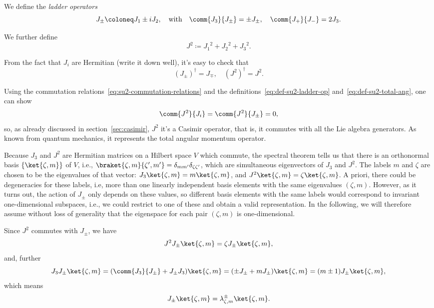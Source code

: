 We define the \emph{ladder operators}
\begin{equation}\label{eq:def-su2-ladder-op}
    J_\pm \coloneq J_1 \pm i J_2, \quad \textup{with} \quad \comm{J_3}{J_\pm} = \pm J_\pm, \quad \comm{J_+}{J_-} = 2 J_3 .
\end{equation}

We further define
\begin{equation}\label{eq:def-su2-total-ang}
    J^2 \coloneq {J_1}^2 + {J_2}^2 + {J_3}^2.
\end{equation}

From the fact that $J_i$ are Hermitian (write it down well), it's easy to check that
\begin{equation}
    (J_\pm)^\dagger = J_\mp, \quad (J^2)^\dagger = J^2 .
\end{equation}

Using the commutation relations~\eqref{eq:su2-commutation-relations} and the definitions~\eqref{eq:def-su2-ladder-op} and~\eqref{eq:def-su2-total-ang}, one can show
\begin{equation}
    \comm{J^2}{J_i} = \comm{J^2}{J_\pm} = 0,
\end{equation}
so, as already discussed in section~\eqref{sec:casimir}, $J^2$ it's a Casimir operator, that is, it commutes with all the Lie algebra generators. As known from quantum mechanics, it represents the total angular momentum operator.

Because $J_3$ and $J^2$ are Hermitian matrices on a Hilbert space $V$ which commute, the spectral theorem tells us that there is an orthonormal basis $\{ \ket{\zeta, m} \}$ of $V$, i.e., $\braket{\zeta, m}{\zeta',m'} = \delta_{mm'} \delta_{\zeta\zeta'}$, which are simultaneous eigenvectors of $J_3$ and $J^2$. The labels $m$ and $\zeta$ are chosen to be the eigenvalues of that vector: $J_3 \ket{\zeta, m} = m \ket{\zeta, m}$, and $J^2 \ket{\zeta, m} = \zeta \ket{\zeta, m}$. A priori, there could be degeneracies for these labels, i.e, more than one linearly independent basis elements with the same eigenvalues $(\zeta,m)$. However, as it turns out, the action of $J_\pm$ only depends on these values, so different basis elements with the same labels would correspond to invariant one-dimensional subspaces, i.e., we could restrict to one of these and obtain a valid representation. In the following, we will therefore assume without loss of generality that the eigenspace for each pair $(\zeta,m)$ is one-dimensional.

Since $J^2$ commutes with $J_\pm$, we have
\begin{equation*}
    J^2 J_\pm \ket{\zeta, m} = \zeta J_\pm \ket{\zeta, m},
\end{equation*}
and, further
\begin{equation*}
    J_3 J_\pm \ket{\zeta, m} = (\comm{J_3}{J_\pm} + J_\pm J_3) \ket{\zeta, m} = (\pm J_\pm + m J_\pm) \ket{\zeta, m} = (m \pm 1) J_\pm \ket{\zeta, m},
\end{equation*}
which means
\begin{equation}
    J_\pm \ket{\zeta, m} = \lambda^\pm_{\zeta,m} \ket{\zeta, m} .
\end{equation}

